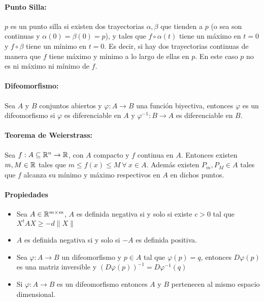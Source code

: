 \paragraph{Punto Silla:} $p$ es un punto silla si existen dos trayectorias $\alpha,\beta$ que tienden a $p$ (o sea son continuas y $\alpha(0)=\beta(0) = p$), y tales que $f\circ\alpha(t)$ tiene un máximo en $t=0$ y $f\circ\beta$ tiene un mínimo en $t=0$. Es decir, si hay dos trayectorias continuas de manera que $f$ tiene máximo y mínimo a lo largo de ellas en $p$. En este caso $p$ no es ni máximo ni mínimo de $f$.

\paragraph{Difeomorfismo:} Sea $A$ y $B$ conjuntos abiertos y $\varphi: A\to B$ una función biyectiva, entonces $\varphi$ es un difeomorfismo si $\varphi$ es diferenciable en $A$ y $\varphi^{-1}: B\to A$ es diferenciable en $B$.

\paragraph{Teorema de Weierstrass:} Sea $f:A\subseteq\mathbb{R}^n\to\mathbb{R}$, con $A$ compacto y $f$ continua en $A$. Entonces existen $m,M\in\mathbb{R}$ tales que $m \leq f(x) \leq M~\forall~x\in A$. Además existen $P_m,P_M\in A$ tales que $f$ alcanza su mínimo y máximo respectivos en $A$ en dichos puntos.

\paragraph{Propiedades}
\begin{itemize}

\item Sea $A\in\mathbb{R}^{m\times m}$, $A$ es definida negativa si y solo si existe $c>0$ tal que $X^tAX\geq -d\|X\|$
\item $A$ es definida negativa si y solo si $-A$ es definida positiva.
\item Sea $\varphi:A\to B$ un difeomorfismo y $p\in A$ tal que $\varphi(p) = q$, entonces $D\varphi(p)$ es una matriz inversible y $(D\varphi(p))^{-1} = D\varphi^{-1}(q)$
\item Si $\varphi:A\to B$ es un difeomorfismo entonces $A$ y $B$ pertenecen al mismo espacio dimensional.

\end{itemize}

